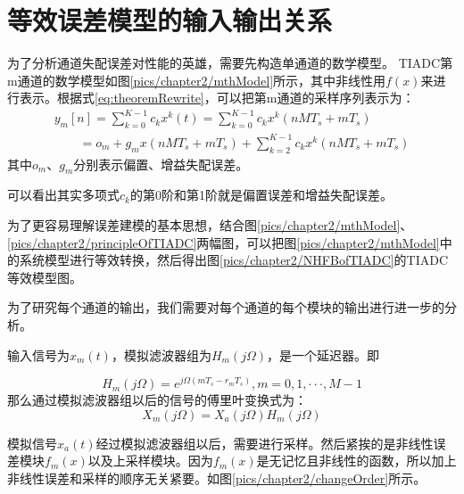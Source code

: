 	\section{等效误差模型的输入输出关系} \label{sec:modelWithError}
		为了分析通道失配误差对性能的英雄，需要先构造单通道的数学模型。
		TIADC第m通道的数学模型如图\ref{pics/chapter2/mthModel}所示，其中非线性用$f(x)$来进行表示。根据式\ref{eq:theoremRewrite}，可以把第m通道的采样序列表示为：
			\begin{equation}
				\begin{array}{l}
{y_m}\left[ n \right] = \sum\limits_{k = 0}^{K - 1} {{c_k}{x^k}\left( t \right)}  = \sum\limits_{k = 0}^{K - 1} {{c_k}{x^k}\left( {nM{T_s} + m{T_s}} \right)} \\
\,\,\,\,\,\,\,\,\,\,\,\, = {o_m} + {g_m}x\left( {nM{T_s} + m{T_s}} \right) + \sum\limits_{k = 2}^{K - 1} {{c_k}{x^k}\left( {nM{T_s} + m{T_s}} \right)} \label{eq:y_m}
\end{array}
			\end{equation}
		其中$o_m$、$g_m$分别表示偏置、增益失配误差。\par
		可以看出其实多项式$c_k$的第0阶和第1阶就是偏置误差和增益失配误差。\par
		为了更容易理解误差建模的基本思想，结合图\ref{pics/chapter2/mthModel}、\ref{pics/chapter2/principleOfTIADC}两幅图，可以把图\ref{pics/chapter2/mthModel}中的系统模型进行等效转换，然后得出图\ref{pics/chapter2/NHFBofTIADC}的TIADC等效模型图。
			
		
	为了研究每个通道的输出，我们需要对每个通道的每个模块的输出进行进一步的分析。
	\par
	输入信号为${x_m}(t)$，模拟滤波器组为${H_m}(j\Omega )$，是一个延迟器。即
	
		\begin{equation}
			{H_m}(j\Omega ) = {e^{j\Omega (m{T_s} - {r_m}{T_s})}},m = 0,1, \cdot  \cdot  \cdot ,M - 1
		\end{equation}
	那么通过模拟滤波器组以后的信号的傅里叶变换式为：
		\begin{equation}
			{X_m}\left( {j\Omega } \right) = {X_a}\left( {j\Omega } \right){H_m}\left( {j\Omega } \right)
		\end{equation}
		
	模拟信号${x_a}(t)$经过模拟滤波器组以后，需要进行采样。然后紧挨的是非线性误差模块$f_m(x)$以及上采样模块。因为$f_m(x)$是无记忆且非线性的函数，所以加上非线性误差和采样的顺序无关紧要。如图\ref{pics/chapter2/changeOrder}所示。
	
